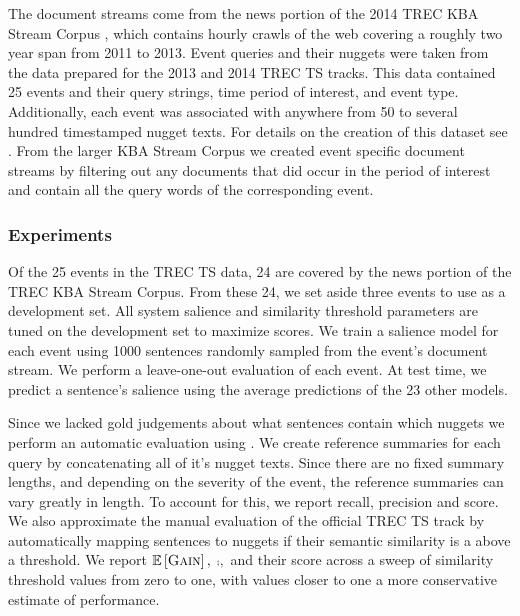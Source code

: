     
  The document streams come from the news portion of the 2014 TREC
KBA Stream Corpus \citep{frank2012building}, which contains hourly crawls
of the web covering a roughly two year span from 2011 to 2013.
Event queries and their nuggets were taken from the data prepared for 
the 2013 and 2014 TREC TS tracks. This data
contained 25 events and their query strings, time period of interest, and
event type. 
Additionally, each event was associated with anywhere from 50 to several
hundred timestamped nugget texts. 
For details on the creation of this dataset see \cite{aslam2014trec,aslam2015trec}.
From the larger KBA Stream Corpus we created event specific document 
streams by filtering out any documents that did occur in the period
of interest and contain all the query words of the corresponding event.  



    \subsubsection{Experiments}

    

Of the 25 events in the TREC TS data, 24 are
covered by the news portion of the TREC KBA
Stream Corpus. From these 24, we set aside
three events to use as a development set. All
system salience and similarity threshold parameters
are tuned on the development set to maximize
 \fmeasure{} scores.
We train a salience model for each event using
1000 sentences randomly sampled from the
event's document stream.
We perform a leave-one-out evaluation of each
event. At test time, we predict a sentence’s
salience using the average predictions of the 23
other models.



    Since we lacked gold judgements about what sentences contain which nuggets
    we perform an automatic evaluation using \rouge{} \citep{lin2004rouge}. We 
    create reference summaries for each query by concatenating all 
    of it's nugget texts.
    Since there are no fixed summary lengths, and depending on the severity
    of the event, the reference summaries can vary greatly in length.
    To account for this, we report \rouge{} recall, precision and \fmeasure{}
    score.
We also approximate the manual evaluation of the official TREC TS track
    by automatically mapping sentences to nuggets if their semantic similarity
    is a above a threshold. 
    We report $\mathbb{E}\left[\textsc{Gain}\right],$ $\comp,$ and their \fmeasure{} score
    across a sweep of similarity threshold 
    values from zero to one, with values closer to one a more conservative
    estimate of performance.     


